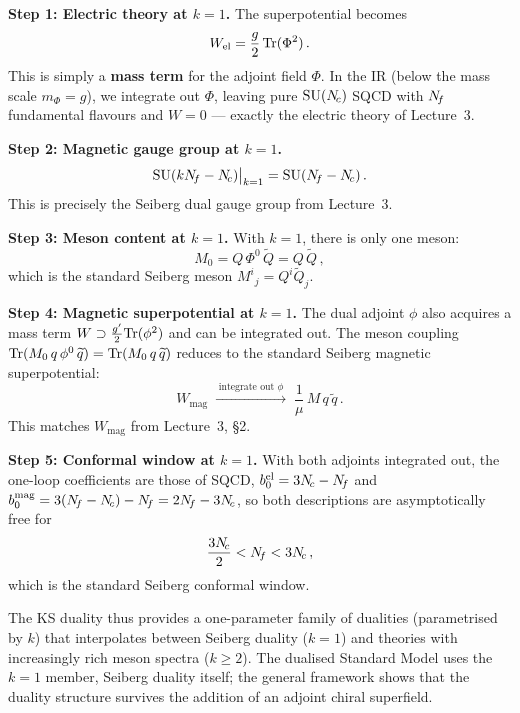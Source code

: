 \documentclass[11pt,a4paper]{article}
\begin{document}
\begin{tcolorbox}[
  enhanced,
  colback=green!5!white,
  colframe=green!60!black,
  fonttitle=\bfseries,
  title={KS at $k=1$: Recovering Seiberg Duality},
  breakable
]
\textbf{Step 1: Electric theory at $k=1$.}
The superpotential becomes
\[
  W_{\text{el}} = \frac{g}{2}\,\mathrm{Tr}(\Phi^2)\,.
\]
This is simply a \textbf{mass term} for the adjoint field $\Phi$.
In the IR (below the mass scale $m_\Phi = g$), we integrate out
$\Phi$, leaving pure $\mathrm{SU}(N_{\!c})$ SQCD with $N_{\!f}$ fundamental
flavours and $W = 0$ --- exactly the electric theory of Lecture~3.

\medskip

\textbf{Step 2: Magnetic gauge group at $k=1$.}
\[
  \mathrm{SU}(kN_{\!f} - N_{\!c})\big|_{k=1} = \mathrm{SU}(N_{\!f} - N_{\!c})\,.
\]
This is precisely the Seiberg dual gauge group from Lecture~3.
\checkmark

\medskip

\textbf{Step 3: Meson content at $k=1$.}
With $k=1$, there is only one meson:
\[
  M_0 = Q\,\Phi^0\,\widetilde{Q} = Q\,\widetilde{Q}\,,
\]
which is the standard Seiberg meson $M^i{}_j =
Q^i \widetilde{Q}_j$. \checkmark

\medskip

\textbf{Step 4: Magnetic superpotential at $k=1$.}
The dual adjoint $\phi$ also acquires a mass term
$W \supset \frac{g'}{2}\mathrm{Tr}(\phi^2)$ and can be integrated out.
The meson coupling $\mathrm{Tr}(M_0\, q\, \phi^0\, \widetilde{q})
= \mathrm{Tr}(M_0\, q\, \widetilde{q})$ reduces to the standard Seiberg
magnetic superpotential:
\[
  W_{\text{mag}} \;\xrightarrow{\;\text{integrate out } \phi\;}
  \;\frac{1}{\mu}\, M\, q\, \widetilde{q}\,.
\]
This matches $W_{\text{mag}}$ from Lecture~3, \S2. \checkmark

\medskip

\textbf{Step 5: Conformal window at $k=1$.}
With both adjoints integrated out, the one-loop coefficients are those
of SQCD, $b_0^{\text{el}} = 3N_{\!c} - N_{\!f}$ and
$b_0^{\text{mag}} = 3(N_{\!f} - N_{\!c}) - N_{\!f} = 2N_{\!f} - 3N_{\!c}$, so both
descriptions are asymptotically free for
\[
  \frac{3N_{\!c}}{2} < N_{\!f} < 3N_{\!c}\,,
\]
which is the standard Seiberg conformal window. \checkmark
\end{tcolorbox}

The KS duality thus provides a one-parameter family of dualities
(parametrised by $k$) that interpolates between Seiberg duality
($k=1$) and theories with increasingly rich meson spectra
($k \geq 2$).  The dualised Standard Model uses the $k = 1$ member,
Seiberg duality itself; the general framework shows that the duality
structure survives the addition of an adjoint chiral superfield.
\end{document}
